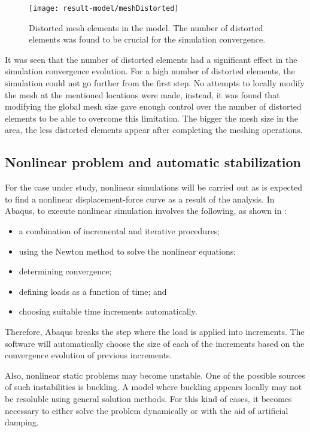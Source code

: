     \begin{figure}[!htpb]
      \centering
      \texttt{[image: result-model/meshDistorted]}
      \caption[Distorted mesh elements in the model]{Distorted mesh elements in the model. The number of distorted elements was found to be crucial for the simulation convergence.}\label{fig:meshDistorted}
    \end{figure}

    It was seen that the number of distorted elements had a significant effect in the simulation convergence evolution. For a high number of distorted elements, the simulation could not go further from the first step. No attempts to locally modify the mesh at the mentioned locations were made, instead, it was found that modifying the global mesh size gave enough control over the number of distorted elements to be able to overcome this limitation. The bigger the mesh size in the area, the less distorted elements appear after completing the meshing operations.

  \clearpage
  \subsection{Nonlinear problem and automatic stabilization} \label{subsec:nonlinear_results_model} %

    For the case under study, nonlinear simulations will be carried out as is expected to find a nonlinear displacement-force curve as a result of the analysis. In Abaqus, to execute nonlinear simulation involves the following, as shown in \cite{Abaqus}:

    \begin{itemize}
      \item a combination of incremental and iterative procedures;
      \item using the Newton method to solve the nonlinear equations;
      \item determining convergence;
      \item defining loads as a function of time; and
      \item choosing suitable time increments automatically.
    \end{itemize}

    Therefore, Abaqus breaks the step where the load is applied into increments. The software will automatically choose the size of each of the increments based on the convergence evolution of previous increments.

    Also, nonlinear static problems may become unstable. One of the possible sources of such instabilities is buckling. A model where buckling appears locally may not be resoluble using general solution methods. For this kind of cases, it becomes necessary to either solve the problem dynamically or with the aid of artificial damping.

